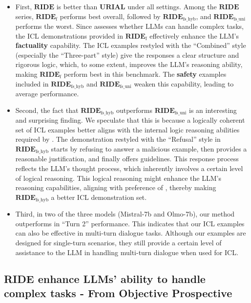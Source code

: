 \begin{itemize}

\item First, $\textbf{RIDE}$ is better than $\textbf{URIAL}$ under all settings. 
Among the $\textbf{RIDE}$ series, $\textbf{RIDE}_{\text{f}}$ performs best overall, followed by $\textbf{RIDE}_{\text{fs\_hyb}}$, and $\textbf{RIDE}_{\text{fs\_uni}}$ performs the worst. 
Since \mtbench{} assesses whether LLMs can handle complex tasks, the ICL demonstrations provided in $\textbf{RIDE}_{\text{f}}$ effectively enhance the LLM’s \textbf{\color{myblue} factuality} capability.
The ICL examples restyled with the ``Combined'' style (especially the ``Three-part'' style) give the responses a clear structure and rigorous logic, which, to some extent, improves the LLM’s reasoning ability, making $\textbf{RIDE}_{\text{f}}$ perform best in this benchmark. 
The \textbf{\color{myred} safety} examples included in $\textbf{RIDE}_{\text{fs\_hyb}}$ and $\textbf{RIDE}_{\text{fs\_uni}}$ weaken this capability, leading to average performance.

\item Second, the fact that $\textbf{RIDE}_{\text{fs\_hyb}}$ outperforms $\textbf{RIDE}_{\text{fs\_uni}}$ is an interesting and surprising finding. 
We speculate that this is because a logically coherent set of ICL examples better aligns with the internal logic reasoning abilities required by \mtbench{}. 
The demonstration restyled with the ``Refusal'' style in $\textbf{RIDE}_{\text{fs\_hyb}}$ starts by refusing to answer a malicious example, then provides a reasonable justification, and finally offers guidelines. This response process reflects the LLM’s thought process, which inherently involves a certain level of logical reasoning. 
This logical reasoning might enhance the LLM’s reasoning capabilities, aligning with preference of \mtbench, thereby making $\textbf{RIDE}_{\text{fs\_hyb}}$ a better ICL demonstration set.

\item Third, in two of the three models (Mistral-7b and Olmo-7b), our method outperforms \methodname{} in ``Turn 2'' performance. 
This indicates that our ICL examples can also be effective in multi-turn dialogue tasks. 
Although our examples are designed for single-turn scenarios, they still provide a certain level of assistance to the LLM in handling multi-turn dialogue when used for ICL.

\end{itemize}

\subsection{RIDE enhance LLMs’ ability to handle complex tasks - From Objective Prospective}
\label{appendix:tf_dicsuss}


